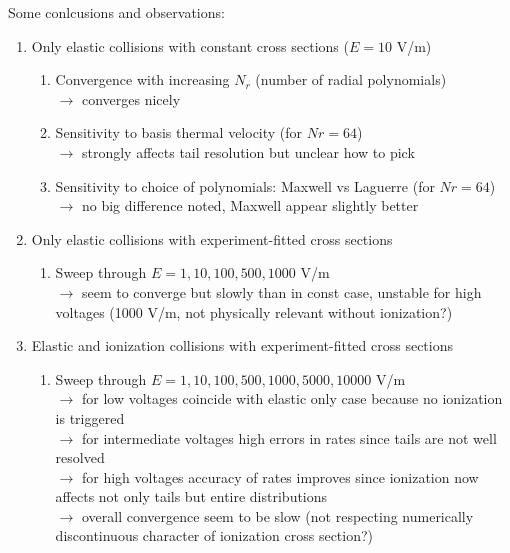 \documentclass[mathserif, aspectratio=169]{beamer}
\begin{document}
\begin{frame}
Some conlcusions and observations:
\begin{enumerate}
\item Only elastic collisions with constant cross sections ($E=10$ V/m)
\begin{enumerate}
\item Convergence with increasing $N_r$ (number of radial polynomials)
\\ $\rightarrow$ converges nicely
\item Sensitivity to basis thermal velocity (for $Nr = 64$)
\\ $\rightarrow$ strongly affects tail resolution but unclear how to pick
\item Sensitivity to choice of polynomials: Maxwell vs Laguerre (for $Nr = 64$)
\\ $\rightarrow$ no big difference noted, Maxwell appear slightly better
\end{enumerate}
\item Only elastic collisions with experiment-fitted cross sections
\begin{enumerate}
\item Sweep through $E = 1, 10, 100, 500, 1000$ V/m
\\ $\rightarrow$ seem to converge but slowly than in const case, unstable for high voltages (1000 V/m, not physically relevant without ionization?)
\end{enumerate}
\item Elastic and ionization collisions with experiment-fitted cross sections
\begin{enumerate}
\item Sweep through $E = 1, 10, 100, 500, 1000, 5000, 10000$ V/m
\\ $\rightarrow$ for low voltages coincide with elastic only case because no ionization is triggered
\\ $\rightarrow$ for intermediate voltages high errors in rates since tails are not well resolved
\\ $\rightarrow$ for high voltages accuracy of rates improves since ionization now affects not only tails but entire distributions
\\ $\rightarrow$ overall convergence seem to be slow (not respecting numerically discontinuous character of ionization cross section?)
\end{enumerate}
\end{enumerate}

\end{frame}
\end{document}
